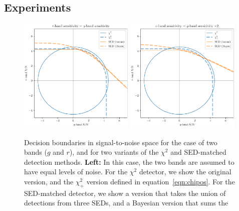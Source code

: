 \documentclass[11pt,letterpaper,linenumbers]{aastex63}
\newcommand{\equationname}{equation}
\newcommand{\eqnref}[1]{\mbox{\equationname~\ref{#1}}}
\newcommand{\chipos}{\chi_+}
\begin{document}
\subsection{Experiments}
\label{sec:chisq_expt}

\begin{figure}
  \begin{center}
    \includegraphics[width=0.49\textwidth]{chisq-pos-decision-boundary}%
    \hspace{0.01\textwidth}%
    \includegraphics[width=0.49\textwidth]{chisq-pos-decision-boundary-sens}%
  \end{center}
  \caption{Decision boundaries in signal-to-noise space for the case
    of two bands ($g$ and $r$), and for two variants of the $\chi^2$
    and SED-matched detection methods.  \textbf{Left:} In this case,
    the two bands are assumed to have equal levels of noise.  For the
    $\chi^2$ detector, we show the original version, and the
    $\chipos^2$ version defined in \eqnref{eqn:chipos}.  For the
    SED-matched detector, we show a version that takes the union of
    detections from three SEDs, and a Bayesian version that sums the
}
\end{figure}
\end{document}
